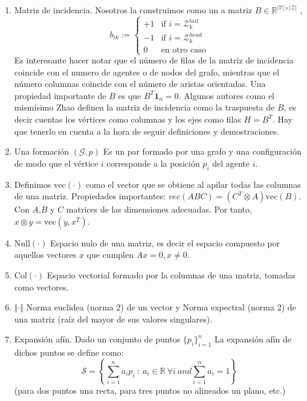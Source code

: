 \documentclass[10pt,a4paper]{article}
\begin{document}
\begin{enumerate}
\item Matriz de incidencia. Nosotros la construimos como un a matriz $B \in \mathbb{R}^{\vert \mathcal{V} \vert \times \vert \mathcal{Z}\vert}$ \cite{Marina2021},
\begin{equation}
b_{ik}:= \left\{ \begin{array}{ll}
+1 & \text{if } i =\mathcal{Z}_k^{tail}\\
-1 & \text{if } i = \mathcal{Z}_k^{head}\\
0  & \text{en otro caso} 
\end{array} \right.
\end{equation} 
Es interesante hacer notar que el número de filas de la matriz de incidencia coincide con el numero de agentes o de nodos del grafo, mientras que el número columnas coincide con el número de aristas orientadas. Una propiedad importante de $B$ es que $B^T\mathbf{1}_n =0$. Algunos autores como el mismísimo Zhao definen la matriz de incidencia como la traspuesta de $B$, es decir cuentas los vértices como columnas y los ejes como filas $H=B^T$. Hay que tenerlo en cuenta a la hora de seguir definiciones y demostraciones.

\item Una formación $(\mathcal{G},p)$ Es un par formado por una grafo y una configuración de modo que el vértice $i$ corresponde a la posición $p_i$ del agente $i$.

\item Definimos $\text{vec}(\cdot)$ como el vector que se obtiene al apilar todas las columnas de una matriz. Propiedades importantes: $vec(ABC) = (C^T \otimes A)\text{vec}(B)$. Con $A$,$B$ y $C$ matrices de las dimensiones adecuadas. Por tanto, $x\otimes y =\text{vec}(y,x^T)$.

\item $\text{Null}(\cdot)$ Espacio nulo de una matriz, es decir el espacio compuesto por aquellos vectores $x$ que cumplen $Ax=0, x \neq 0$.
\item $\text{Col}(\cdot)$ Espacio vectorial formado por la columnas de una matriz, tomadas como vectores.

\item $\Vert \cdot \Vert$ Norma euclidea (norma 2) de un vector y Norma expectral (norma 2) de una matriz (raíz del mayor de sus valores singulares).

\item Expansión afín. Dado un conjunto de puntos $\{p_i\}_{i=1}^n$ La expansión afín de dichos puntos se define como:
\begin{equation}
\mathcal{S} = \left\lbrace \sum_{i=1}^na_ip_i\ :\ a_i \in \mathbb{R}\ \forall i\ and \sum_{i=1}^na_i = 1 \right\rbrace
\end{equation}
(para dos puntos una recta, para tres puntos no alineados un plano, etc.)


\end{enumerate}
\end{document}
